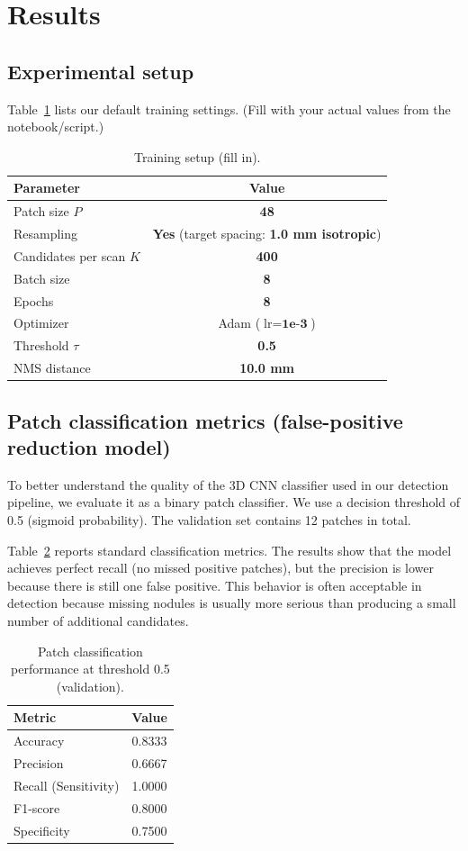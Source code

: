 \section{Results}
\subsection{Experimental setup}
Table~\ref{tab:trainsetup} lists our default training settings. (Fill with your actual values from the notebook/script.)

\begin{table}[H]
\centering
\caption{Training setup (fill in).}
\label{tab:trainsetup}
\begin{tabular}{lc}
\toprule
Parameter & Value \\
\midrule
Patch size $P$ & \textbf{48} \\
Resampling & \textbf{Yes} (target spacing: \textbf{1.0 mm isotropic}) \\
Candidates per scan $K$ & \textbf{400} \\
Batch size & \textbf{8} \\
Epochs & \textbf{8} \\
Optimizer & Adam ($\text{lr}=\textbf{1e-3}$) \\
Threshold $\tau$ & \textbf{0.5} \\
NMS distance & \textbf{10.0 mm} \\
\bottomrule
\end{tabular}
\end{table}

\subsection{Patch classification metrics (false-positive reduction model)}
To better understand the quality of the 3D CNN classifier used in our detection pipeline, we evaluate it as a binary patch classifier. We use a decision threshold of 0.5 (sigmoid probability). The validation set contains 12 patches in total.

Table~\ref{tab:cls_metrics} reports standard classification metrics. The results show that the model achieves perfect recall (no missed positive patches), but the precision is lower because there is still one false positive. This behavior is often acceptable in detection because missing nodules is usually more serious than producing a small number of additional candidates.

\begin{table}[H]
\centering
\caption{Patch classification performance at threshold 0.5 (validation).}
\label{tab:cls_metrics}
\begin{tabular}{lc}
\toprule
Metric & Value \\
\midrule
Accuracy & 0.8333 \\
Precision & 0.6667 \\
Recall (Sensitivity) & 1.0000 \\
F1-score & 0.8000 \\
Specificity & 0.7500 \\
\bottomrule
\end{tabular}
\end{table}

